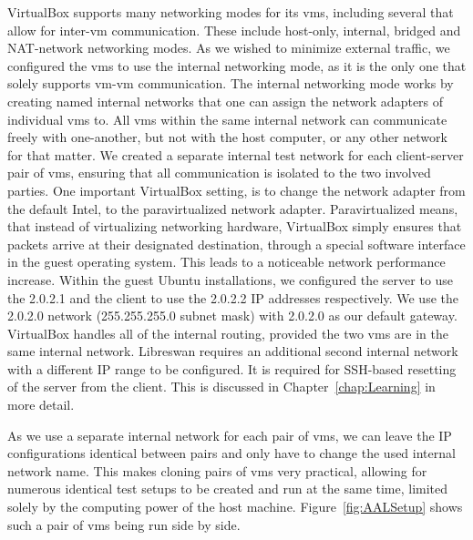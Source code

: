 VirtualBox supports many networking modes for its \acp{vm}, including several that allow for inter-\ac{vm} communication. These include host-only, internal, bridged and NAT-network networking modes.
As we wished to minimize external traffic, we configured the \acp{vm} to use the internal networking mode, as it is the only one that solely supports \ac{vm}-\ac{vm} communication.
The internal networking mode works by creating named internal networks that one can assign the network adapters of individual \acp{vm} to. All \acp{vm} within the same internal network can communicate freely with one-another, but not with the host computer, or any other network for that matter. We created a separate internal test network for each client-server pair of \acp{vm}, ensuring that all communication is isolated to the two involved parties. One important VirtualBox setting, is to change the network adapter from the default Intel, to the paravirtualized network adapter. Paravirtualized means, that instead of virtualizing networking hardware, VirtualBox simply ensures that packets arrive at their designated destination, through a special software interface in the guest operating system. This leads to a noticeable network performance increase. Within the guest Ubuntu installations, we configured the server to use the 2.0.2.1 and the client to use the 2.0.2.2 IP addresses respectively. We use the 2.0.2.0 network (255.255.255.0 subnet mask) with 2.0.2.0 as our default gateway. VirtualBox handles all of the internal routing, provided the two \acp{vm} are in the same internal network. Libreswan requires an additional second internal network with a different IP range to be configured. It is required for SSH-based resetting of the server from the client. This is discussed in Chapter~\ref{chap:Learning} in more detail.

As we use a separate internal network for each pair of \acp{vm}, we can leave the IP configurations identical between pairs and only have to change the used internal network name. This makes cloning pairs of \acp{vm} very practical, allowing for numerous identical test setups to be created and run at the same time, limited solely by the computing power of the host machine. Figure~\ref{fig:AALSetup} shows such a pair of \acp{vm} being run side by side.

